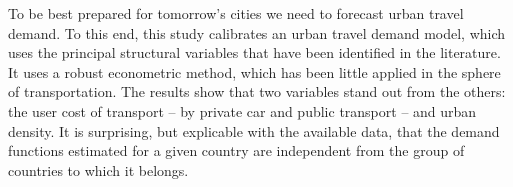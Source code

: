 To be best prepared for tomorrow's cities we need to forecast urban travel demand. To this end, this study calibrates an urban travel demand model, which uses the principal structural variables that have been identified in the literature. It uses a robust econometric method, which has been little applied in the sphere of transportation. The results show that two variables stand out from the others: the user cost of transport – by private car and public transport – and urban density. It is surprising, but explicable with the available data, that the demand functions estimated for a given country are independent from the group of countries to which it belongs.